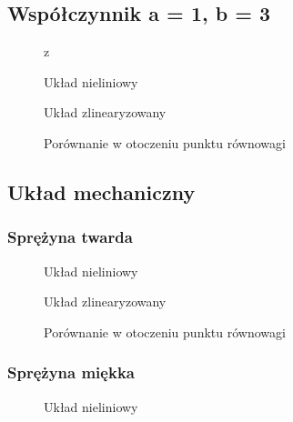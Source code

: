 \documentclass[a4paper, 10pt]{article}
\begin{document}
			\subsection{Współczynnik a = 1, b = 3}
				\begin{figure}[H]
					\centering
					\def \svgwidth{0.75\columnwidth}z
					
					\caption{Układ nieliniowy}
				\end{figure}\noindent


				\begin{figure}[H]
					\centering
					\def \svgwidth{0.75\columnwidth}
					
					\caption{Układ zlinearyzowany}
				\end{figure}\noindent


				\begin{figure}[H]
					\centering
					\def \svgwidth{0.75\columnwidth}
					
					\caption{Porównanie w otoczeniu punktu równowagi}
				\end{figure}\noindent

		\subsection{Układ mechaniczny}
			\subsubsection{Sprężyna twarda}
				\begin{figure}[H]
					\centering
					\def \svgwidth{0.75\columnwidth}
					
					\caption{Układ nieliniowy}
				\end{figure}\noindent


				\begin{figure}[H]
					\centering
					\def \svgwidth{0.75\columnwidth}
					
					\caption{Układ zlinearyzowany}
				\end{figure}\noindent


				\begin{figure}[H]
					\centering
					\def \svgwidth{0.75\columnwidth}
					
					\caption{Porównanie w otoczeniu punktu równowagi}
				\end{figure}\noindent

			\subsubsection{Sprężyna miękka}
				\begin{figure}[H]
					\centering
					\def \svgwidth{0.75\columnwidth}
					
					\caption{Układ nieliniowy}
				\end{figure}\noindent
\end{document}
